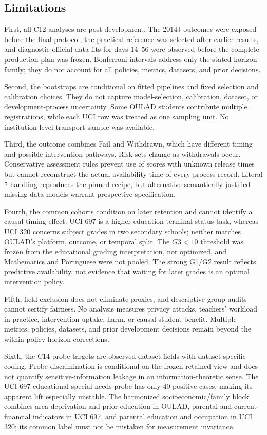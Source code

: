 \documentclass[11pt]{article}
\begin{document}
\subsection{Limitations}

First, all C12 analyses are post-development. The 2014J outcomes were exposed before the final protocol, the practical reference was selected after earlier results, and diagnostic official-data fits for days 14--56 were observed before the complete production plan was frozen. Bonferroni intervals address only the stated horizon family; they do not account for all policies, metrics, datasets, and prior decisions.

Second, the bootstraps are conditional on fitted pipelines and fixed selection and calibration choices. They do not capture model-selection, calibration, dataset, or development-process uncertainty. Some OULAD students contribute multiple registrations, while each UCI row was treated as one sampling unit. No institution-level transport sample was available.

Third, the outcome combines Fail and Withdrawn, which have different timing and possible intervention pathways. Risk sets change as withdrawals occur. Conservative assessment rules prevent use of scores with unknown release times but cannot reconstruct the actual availability time of every process record. Literal \texttt{?} handling reproduces the pinned recipe, but alternative semantically justified missing-data models warrant prospective specification.

Fourth, the common cohorts condition on later retention and cannot identify a causal timing effect. UCI 697 is a higher-education terminal-status task, whereas UCI 320 concerns subject grades in two secondary schools; neither matches OULAD's platform, outcome, or temporal split. The $G3<10$ threshold was frozen from the educational grading interpretation, not optimized, and Mathematics and Portuguese were not pooled. The strong G1/G2 result reflects predictive availability, not evidence that waiting for later grades is an optimal intervention policy.

Fifth, field exclusion does not eliminate proxies, and descriptive group audits cannot certify fairness. No analysis measures privacy attacks, teachers' workload in practice, intervention uptake, harm, or causal student benefit. Multiple metrics, policies, datasets, and prior development decisions remain beyond the within-policy horizon corrections.

Sixth, the C14 probe targets are observed dataset fields with dataset-specific coding. Probe discrimination is conditional on the frozen retained view and does not quantify sensitive-information leakage in an information-theoretic sense. The UCI 697 educational special-needs probe has only 40 positive cases, making its apparent lift especially unstable. The harmonized socioeconomic/family block combines area deprivation and prior education in OULAD, parental and current financial indicators in UCI 697, and parental education and occupation in UCI 320; its common label must not be mistaken for measurement invariance.
\end{document}
